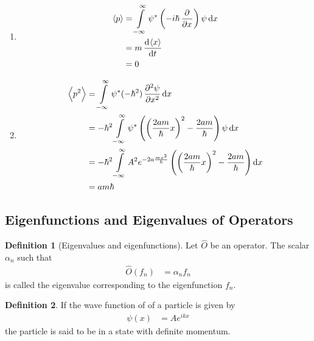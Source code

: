 \documentclass[titlepage, fleqn, a4paper, 12pt, twoside]{article}
\theoremstyle{definition}
\newtheorem{definition}{Definition}
\theoremstyle{theorem}
\begin{document}
\begin{solution}
\begin{enumerate}[leftmargin=*]
\begin{enumerate}[leftmargin=*]
				\item
					\begin{align*}
						\langle p \rangle & = \int\limits_{-\infty}^{\infty} \psi^* \left( -i \hbar \dpd{}{x} \right) \psi \dif x \\
                                                                  & = m \dod{\langle x \rangle}{t}                                                        \\
                                                                  & = 0
					\end{align*}
				\item
					\begin{align*}
						\left\langle p^2 \right\rangle & = \int\limits_{-\infty}^{\infty} \psi^* (-\hbar^2) \dpd[2]{\psi}{x} \dif x                                                                                    \\
                                                                               & = -\hbar^2 \int\limits_{-\infty}^{\infty} \psi^* \left( \left( \frac{2 a m}{\hbar} x \right)^2 - \frac{2 a m}{\hbar} \right) \psi \dif x                      \\
                                                                               & = -\hbar^2 \int\limits_{-\infty}^{\infty} A^2 e^{-2 a \frac{m x^2}{\hbar}} \left( \left( \frac{2 a m}{\hbar} x \right)^2 - \frac{2 a m}{\hbar} \right) \dif x \\
                                                                               & = a m \hbar
					\end{align*}
			\end{enumerate}
	\end{enumerate}
\end{solution}

\subsection{Eigenfunctions and Eigenvalues of Operators}

\begin{definition}[Eigenvalues and eigenfunctions]
	Let $\hat{O}$ be an operator.
	The scalar $\alpha_n$ such that
	\begin{align*}
		\hat{O}(f_n) &= \alpha_n f_n
	\end{align*}
	is called the eigenvalue corresponding to the eigenfunction $f_n$.
\end{definition}

\begin{definition}
	If the wave function of of a particle is given by
	\begin{align*}
		\psi(x) &= A e^{i k x}
	\end{align*}
	the particle is said to be in a state with definite momentum.
\end{definition}
\end{document}
